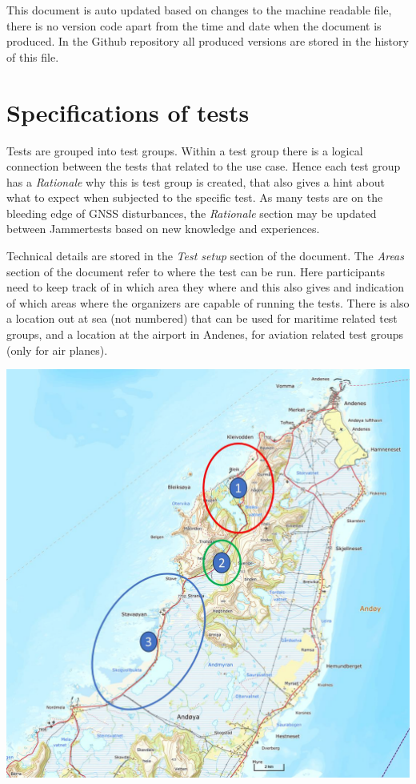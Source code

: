 \documentclass[a4paper]{book}
\begin{document}
This document is auto updated based on changes to the machine readable file, there is no version code apart from the time and date when the document is produced. In the Github repository all produced versions are stored in the history of this file.

\section{Specifications of tests}
Tests are grouped into test groups. Within a test group there is a logical connection between the tests that related to the use case. Hence each test group has a \textit{Rationale} why this is test group is created, that also gives a hint about what to expect when subjected to the specific test. As many tests are on the bleeding edge of GNSS disturbances, the \textit{Rationale} section may be updated between Jammertests based on new knowledge and experiences. \newline

Technical details are stored in the \textit{Test setup} section of the document. The \textit{Areas} section of the document refer to where the test can be run. Here participants need to keep track of in which area they where and this also gives and indication of which areas where the organizers are capable of running the tests. There is also a location out at sea (not numbered) that can be used for maritime related test groups, and a location at the airport in Andenes, for aviation related test groups (only for air planes).

\includegraphics[scale=0.4]{graphics/locations.png}
\end{document}
